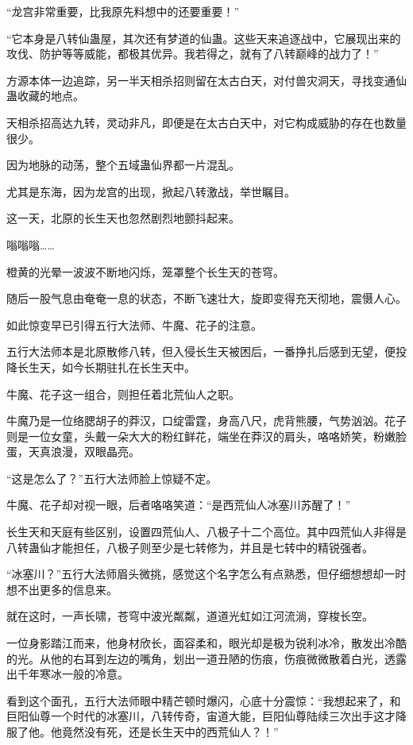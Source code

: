 \begin{this_body}
“龙宫非常重要，比我原先料想中的还要重要！”

“它本身是八转仙蛊屋，其次还有梦道的仙蛊。这些天来追逐战中，它展现出来的攻伐、防护等等威能，都极其优异。我若得之，就有了八转巅峰的战力了！”

方源本体一边追踪，另一半天相杀招则留在太古白天，对付兽灾洞天，寻找变通仙蛊收藏的地点。

天相杀招高达九转，灵动非凡，即便是在太古白天中，对它构成威胁的存在也数量很少。

因为地脉的动荡，整个五域蛊仙界都一片混乱。

尤其是东海，因为龙宫的出现，掀起八转激战，举世瞩目。

这一天，北原的长生天也忽然剧烈地颤抖起来。

嗡嗡嗡……

橙黄的光晕一波波不断地闪烁，笼罩整个长生天的苍穹。

随后一股气息由奄奄一息的状态，不断飞速壮大，旋即变得充天彻地，震慑人心。

如此惊变早已引得五行大法师、牛魔、花子的注意。

五行大法师本是北原散修八转，但入侵长生天被困后，一番挣扎后感到无望，便投降长生天，如今长期驻扎在长生天中。

牛魔、花子这一组合，则担任着北荒仙人之职。

牛魔乃是一位络腮胡子的莽汉，口绽雷霆，身高八尺，虎背熊腰，气势汹汹。花子则是一位女童，头戴一朵大大的粉红鲜花，端坐在莽汉的肩头，咯咯娇笑，粉嫩脸蛋，天真浪漫，双眼晶亮。

“这是怎么了？”五行大法师脸上惊疑不定。

牛魔、花子却对视一眼，后者咯咯笑道：“是西荒仙人冰塞川苏醒了！”

长生天和天庭有些区别，设置四荒仙人、八极子十二个高位。其中四荒仙人非得是八转蛊仙才能担任，八极子则至少是七转修为，并且是七转中的精锐强者。

“冰塞川？”五行大法师眉头微挑，感觉这个名字怎么有点熟悉，但仔细想想却一时想不出更多的信息来。

就在这时，一声长啸，苍穹中波光粼粼，道道光虹如江河流淌，穿梭长空。

一位身影踏江而来，他身材欣长，面容柔和，眼光却是极为锐利冰冷，散发出冷酷的光。从他的右耳到左边的嘴角，划出一道丑陋的伤痕，伤痕微微散着白光，透露出千年寒冰一般的冷意。

看到这个面孔，五行大法师眼中精芒顿时爆闪，心底十分震惊：“我想起来了，和巨阳仙尊一个时代的冰塞川，八转传奇，宙道大能，巨阳仙尊陆续三次出手这才降服了他。他竟然没有死，还是长生天中的西荒仙人？！”


\end{this_body}
